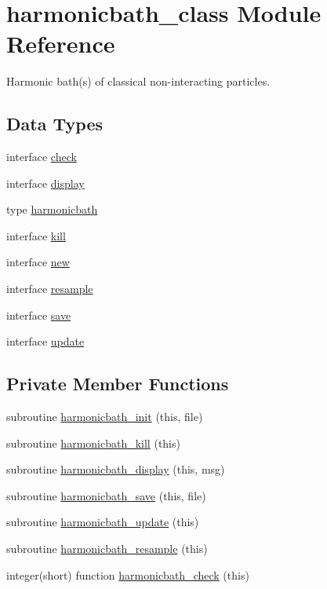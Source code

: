 \hypertarget{classharmonicbath__class}{\section{harmonicbath\-\_\-class Module Reference}
\label{classharmonicbath__class}
}


Harmonic bath(s) of classical non-\/interacting particles.  


\subsection*{Data Types}
\begin{DoxyCompactItemize}
\item 
interface \hyperlink{interfaceharmonicbath__class_1_1check}{check}
\item 
interface \hyperlink{interfaceharmonicbath__class_1_1display}{display}
\item 
type \hyperlink{structharmonicbath__class_1_1harmonicbath}{harmonicbath}
\item 
interface \hyperlink{interfaceharmonicbath__class_1_1kill}{kill}
\item 
interface \hyperlink{interfaceharmonicbath__class_1_1new}{new}
\item 
interface \hyperlink{interfaceharmonicbath__class_1_1resample}{resample}
\item 
interface \hyperlink{interfaceharmonicbath__class_1_1save}{save}
\item 
interface \hyperlink{interfaceharmonicbath__class_1_1update}{update}
\end{DoxyCompactItemize}
\subsection*{Private Member Functions}
\begin{DoxyCompactItemize}
\item 
subroutine \hyperlink{classharmonicbath__class_a7d869bb99a49aa520fe606e808d5feb5}{harmonicbath\-\_\-init} (this, file)
\item 
subroutine \hyperlink{classharmonicbath__class_ae4e0e1b027594bb77034f21e82f6ed63}{harmonicbath\-\_\-kill} (this)
\item 
subroutine \hyperlink{classharmonicbath__class_af4ce5a2a61231e5612ff243262e9f993}{harmonicbath\-\_\-display} (this, msg)
\item 
subroutine \hyperlink{classharmonicbath__class_a9dfb6e87e69957fcc4ec907135931ace}{harmonicbath\-\_\-save} (this, file)
\item 
subroutine \hyperlink{classharmonicbath__class_ac930ca08461d767f4593374465c7229d}{harmonicbath\-\_\-update} (this)
\item 
subroutine \hyperlink{classharmonicbath__class_a6b27afcc7c1f24fec82adf3177d0adb8}{harmonicbath\-\_\-resample} (this)
\item 
integer(short) function \hyperlink{classharmonicbath__class_abde7a862edc5c843e0665c6a6705bd74}{harmonicbath\-\_\-check} (this)
\end{DoxyCompactItemize}


